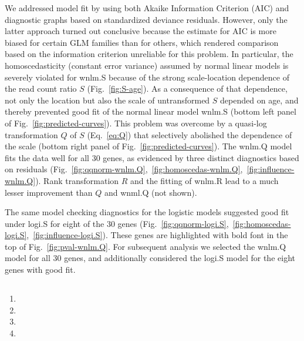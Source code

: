 \documentclass[letterpaper]{article}
\begin{document}
We addressed model fit by using both Akaike Information Criterion (AIC) and
diagnostic graphs based on standardized deviance residuals.  However, only the
latter approach turned out conclusive because the estimate for AIC is more
biased for certain GLM families than for others, which rendered comparison
based on the information criterion unreliable for this problem.  In
particular, the homoscedasticity (constant error variance) assumed by normal
linear models is severely violated for wnlm.S because of the strong
scale-location dependence of the read count ratio \(S\)
(Fig.~\ref{fig:S-age}).  As a consequence of that dependence, not only
the location but also the scale of untransformed \(S\) depended on age, and
thereby prevented good fit of the normal linear model wnlm.S (bottom left
panel of Fig.~\ref{fig:predicted-curves}).  This problem was overcome by a
quasi-log transformation \(Q\) of \(S\) (Eq.~\ref{eq:Q}) that selectively
abolished the dependence of the scale (bottom right panel of
Fig.~\ref{fig:predicted-curves}).  The wnlm.Q model fits the data well for all
30 genes, as evidenced by three distinct diagnostics based on residuals
(Fig.~\ref{fig:qqnorm-wnlm.Q},~\ref{fig:homoscedas-wnlm.Q},~\ref{fig:influence-wnlm.Q}).
Rank transformation \(R\) and the fitting of wnlm.R lead to a much lesser
improvement than \(Q\) and wnml.Q (not shown).

The same model checking diagnostics for the logistic models suggested good
fit under logi.S for eight of the 30 genes
(Fig.~\ref{fig:qqnorm-logi.S},~\ref{fig:homoscedas-logi.S},~\ref{fig:influence-logi.S}).
These genes are highlighted with bold font in the top of Fig.~\ref{fig:pval-wnlm.Q}.
For subsequent analysis we selected  the wnlm.Q model for all 30 genes, and
additionally considered the logi.S model for the eight
genes with good fit.

\subsection{}

\begin{enumerate}
\item {}
\item {}
\item {}
\item {}
\end{enumerate}
\end{document}
